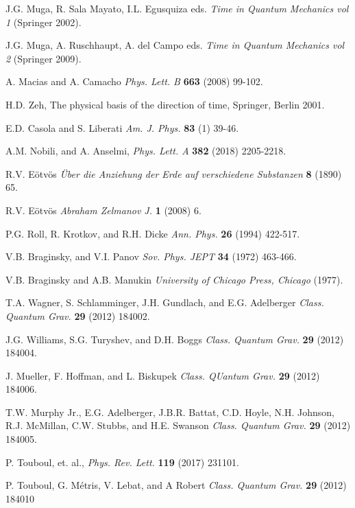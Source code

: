 \documentclass[%
 reprint,
 amsmath,amssymb,
 aps,
]{revtex4-1}
\begin{document}
\begin{thebibliography}{99}

 J.G. Muga, R. Sala Mayato, I.L. Egusquiza eds. {\it Time in Quantum Mechanics vol 1} (Springer 2002).

J.G. Muga, A. Ruschhaupt, A. del Campo eds. {\it Time in Quantum Mechanics vol 2} (Springer 2009).

 A. Macias and A. Camacho {\it Phys. Lett. B} {\bf 663} (2008) 99-102.

 H.D. Zeh, The physical basis of the direction of time, Springer, Berlin 2001.

 E.D. Casola and S. Liberati {\it Am. J. Phys.} {\bf 83} (1) 39-46.

 A.M. Nobili, and A. Anselmi, {\it  Phys. Lett. A} {\bf 382} (2018) 2205-2218. 

 R.V. E\"{o}tv\"{o}s {\it \"{U}ber die Anziehung der Erde auf verschiedene Substanzen} {\bf 8} (1890) 65.

 R.V. E\"{o}tv\"{o}s {\it Abraham Zelmanov J.} {\bf 1} (2008) 6.

 P.G. Roll, R. Krotkov, and R.H. Dicke  {\it Ann. Phys.} {\bf 26} (1994) 422-517.

 V.B. Braginsky, and V.I. Panov {\it Sov. Phys. JEPT} {\bf 34} (1972) 463-466.

V.B. Braginsky and A.B. Manukin {\it University of Chicago Press, Chicago} (1977).

 T.A. Wagner, S. Schlamminger, J.H. Gundlach, and E.G. Adelberger {\it Class. Quantum Grav.} {\bf 29} (2012) 184002.

 J.G. Williams, S.G. Turyshev, and D.H. Boggs {\it Class. Quantum Grav.} {\bf 29} (2012) 184004.

 J. Mueller, F. Hoffman, and L. Biskupek {\it Class. QUantum Grav.} {\bf 29} (2012) 184006.

 T.W. Murphy Jr., E.G. Adelberger, J.B.R. Battat, C.D. Hoyle, N.H. Johnson, R.J. McMillan, C.W. Stubbs, and H.E. Swanson {\it Class. Quantum Grav.} {\bf 29} (2012) 184005.

 P. Touboul, et. al., {\it Phys. Rev. Lett.} {\bf 119} (2017) 231101.

 P. Touboul, G. Métris, V. Lebat, and A Robert {\it Class. Quantum Grav.} {\bf 29} (2012) 184010


\end{thebibliography}
\end{document}
